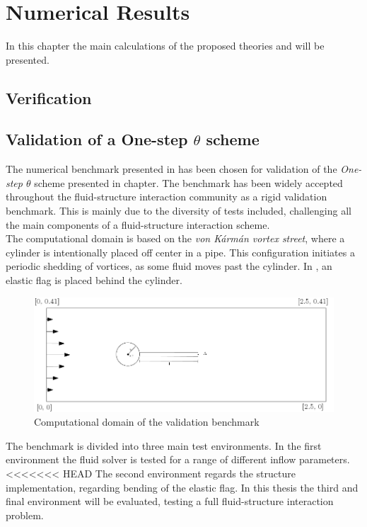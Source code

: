 \chapter{Numerical Results}

In this chapter the main calculations of the proposed theories and will be presented.

\section{Verification}

\section{Validation of a One-step $\theta$ scheme}
The numerical benchmark presented in \cite{Hron2006} has been chosen for validation of the \textit{One-step $\theta$} scheme presented in chapter. The benchmark has been widely accepted throughout the fluid-structure interaction community as a rigid validation benchmark. This is mainly due to the diversity of tests included, challenging all the main components of a fluid-structure interaction scheme. \\
The computational domain is based on the \textit{von Kármán vortex street}, where a cylinder is intentionally placed off center in a pipe. This configuration initiates a periodic shedding of vortices, as some fluid moves past the cylinder. In \cite{Hron2006}, an elastic flag is placed behind the cylinder. \\

\begin{figure}
  \centering
    \includegraphics[scale=0.5]{./Fig/turekflag.png}
      \caption{Computational domain of the validation benchmark}
\end{figure}
\newpage
The benchmark is divided into three main test environments.
In the first environment the fluid solver is tested for a range of different inflow parameters. \\
<<<<<<< HEAD
The second environment regards the structure implementation, regarding bending of the elastic flag. In this thesis the third and final environment will be evaluated, testing a full fluid-structure interaction problem.




